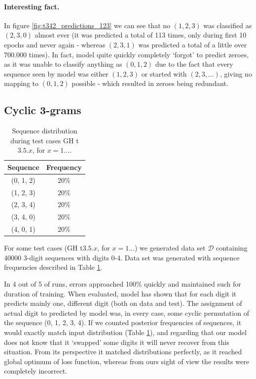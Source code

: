 \documentclass[declaration,shortabstract,lic,english]{iithesis}
\begin{document}
\paragraph{Interesting fact.} In figure \ref{fig:t342_predictions_123} we can see that no $(1, 2, 3)$ was classified as $(2, 3, 0)$ almost ever (it was predicted a total of 113 times, only during first 10 epochs and never again - whereas $(2, 3, 1)$ was predicted a total of a little over 700.000 times). In fact, model quite quickly completely `forgot' to predict zeroes, as it was unable to classify anything as $(0, 1, 2)$ due to the fact that every sequence seen by model was either $(1, 2, 3)$ or started with $(2, 3, \dots)$, giving no mapping to $(0, 1, 2)$ possible - which resulted in zeroes being redundant.


\subsection{Cyclic 3-grams}

\begin{table}[htbp]
\centering
\begin{tabular}{c|c}
    Sequence & Frequency \\
    \hline
    (0, 1, 2) & 20\% \\
    (1, 2, 3) & 20\% \\
    (2, 3, 4) & 20\% \\
    (3, 4, 0) & 20\% \\
    (4, 0, 1) & 20\% \\
\end{tabular}
\caption{Sequence distribution during test cases GH t$3.5.x$, for $x=1\dots$.}
\label{tab:cyclic_test}
\end{table}

For some test cases (GH t$3.5.x$, for $x=1\dots$) we generated data set $\mathcal{D}$ containing 40000 3-digit sequences with digits 0-4. Data set was generated with sequence frequencies described in Table \ref{tab:cyclic_test}.

In 4 out of 5 of runs, errors approached 100\% quickly and maintained such for duration of training. When evaluated, model has shown that for each digit it predicts mainly one, different digit (both on data and test). The assignment of actual digit to predicted by model was, in every case, some cyclic permutation of the sequence (0, 1, 2, 3, 4). If we counted posterior frequencies of sequences, it would exactly match input distribution (Table \ref{tab:cyclic_test}), and regarding that our model does not know that it `swapped' some digits it will never recover from this situation. From its perspective it matched distributions perfectly, as it reached global optimum of loss function, whereas from ours sight of view the results were completely incorrect.
\end{document}
